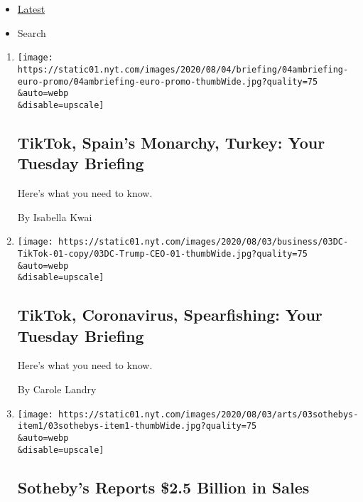 \begin{itemize}
\tightlist
\item
  \protect\hyperlink{stream-panel}{Latest}
\item
  Search
\end{itemize}

\begin{enumerate}
\def\labelenumi{\arabic{enumi}.}
\item
  \href{/2020/08/03/briefing/tiktok-spain-turkey.html}{}

  \texttt{[image: https://static01.nyt.com/images/2020/08/04/briefing/04ambriefing-euro-promo/04ambriefing-euro-promo-thumbWide.jpg?quality=75\\\&auto=webp\\\&disable=upscale]}

  \hypertarget{tiktok-spains-monarchy-turkey-your-tuesday-briefing}{%
  \subsection{TikTok, Spain's Monarchy, Turkey: Your Tuesday
  Briefing}\label{tiktok-spains-monarchy-turkey-your-tuesday-briefing}}

  Here's what you need to know.

  By Isabella Kwai
\item
  \href{/2020/08/03/briefing/coronavirus-tiktok-afghanistan-australia.html}{}

  \texttt{[image: https://static01.nyt.com/images/2020/08/03/business/03DC-TikTok-01-copy/03DC-Trump-CEO-01-thumbWide.jpg?quality=75\\\&auto=webp\\\&disable=upscale]}

  \hypertarget{tiktok-coronavirus-spearfishing-your-tuesday-briefing}{%
  \subsection{TikTok, Coronavirus, Spearfishing: Your Tuesday
  Briefing}\label{tiktok-coronavirus-spearfishing-your-tuesday-briefing}}

  Here's what you need to know.

  By Carole Landry
\item
  \href{/2020/08/03/arts/design/sothebys-sales.html}{}

  \texttt{[image: https://static01.nyt.com/images/2020/08/03/arts/03sothebys-item1/03sothebys-item1-thumbWide.jpg?quality=75\\\&auto=webp\\\&disable=upscale]}

  \hypertarget{sothebys-reports-25-billion-in-sales}{%
  \subsection{Sotheby's Reports \$2.5 Billion in
  Sales}\label{sothebys-reports-25-billion-in-sales}}


\end{enumerate}
